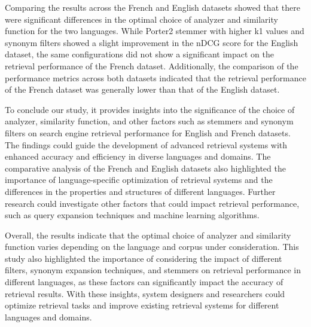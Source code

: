 Comparing the results across the French and English datasets showed that there were significant differences in the optimal choice of analyzer and similarity function for the two languages. While Porter2 stemmer with higher k1 values and synonym filters showed a slight improvement in the nDCG score for the English dataset, the same configurations did not show a significant impact on the retrieval performance of the French dataset. Additionally, the comparison of the performance metrics across both datasets indicated that the retrieval performance of the French dataset was generally lower than that of the English dataset.

To conclude our study, it provides insights into the significance of the choice of analyzer, similarity function, and other factors such as stemmers and synonym filters on search engine retrieval performance for English and French datasets. The findings could guide the development of advanced retrieval systems with enhanced accuracy and efficiency in diverse languages and domains. The comparative analysis of the French and English datasets also highlighted the importance of language-specific optimization of retrieval systems and the differences in the properties and structures of different languages. Further research could investigate other factors that could impact retrieval performance, such as query expansion techniques and machine learning algorithms.

Overall, the results indicate that the optimal choice of analyzer and similarity function varies depending on the language and corpus under consideration. This study also highlighted the importance of considering the impact of different filters, synonym expansion techniques, and stemmers on retrieval performance in different languages, as these factors can significantly impact the accuracy of retrieval results. With these insights, system designers and researchers could optimize retrieval tasks and improve existing retrieval systems for different languages and domains.
